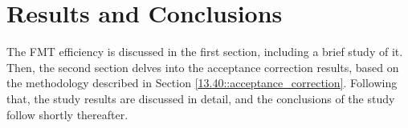 \section{Results and Conclusions}
\label{14::results_and_conclusions}
    The FMT efficiency is discussed in the first section, including a brief study of it.
    Then, the second section delves into the acceptance correction results, based on the methodology described in Section \ref{13.40::acceptance_correction}.
    Following that, the study results are discussed in detail, and the conclusions of the study follow shortly thereafter.

    
    

%
